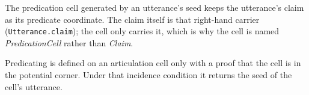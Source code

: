 \begin{theorem}\label{thm:claim-seed-predicate}\leanok{}
The predication cell generated by an utterance's seed keeps the utterance's
claim as its predicate coordinate. The claim itself is that right-hand carrier
(\texttt{Utterance.claim}); the cell only carries it, which is why the cell is
named \emph{PredicationCell} rather than \emph{Claim}.
\end{theorem}

\begin{proposition}\label{thm:predicating-proper}\leanok{}
Predicating is defined on an articulation cell only with a proof that the
cell is in the potential corner. Under that incidence condition it returns
the seed of the cell's utterance.
\end{proposition}
